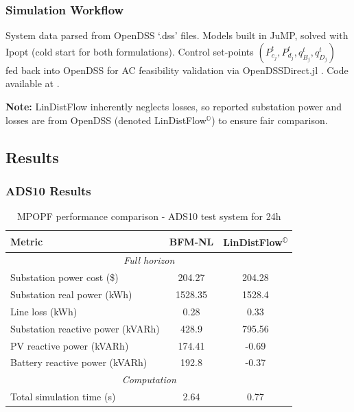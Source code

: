 \subsubsection{Simulation Workflow}

System data parsed from OpenDSS `.dss' files. Models built in JuMP, solved with Ipopt (cold start for both formulations). Control set-points $(P_{c_j}^t, P_{d_j}^t, q_{B_j}^t, q_{D_j}^t)$ fed back into OpenDSS for AC feasibility validation via OpenDSSDirect.jl \cite{OpenDSSDirect-jl}. Code available at \cite{MPOPFRepo}.

\textbf{Note:} LinDistFlow inherently neglects losses, so reported substation power and losses are from OpenDSS (denoted LinDistFlow$^{\mathbb{O}}$) to ensure fair comparison.

\subsection{Results}

\subsubsection{ADS10 Results}

\begin{table}[H]
    \centering
    \caption{MPOPF performance comparison - ADS10 test system for 24h}
    \label{table:mpopf-tradeoffs-opt-ads10}
    \begin{tabular}{|l|c|c|}
    \hline
    \textbf{Metric} & \textbf{BFM-NL} & \textbf{LinDistFlow\textsuperscript{\(\mathbb{O}\)}} \\ \hline
    \multicolumn{3}{|c|}{\textit{Full horizon}} \\ \hline
    Substation power cost (\$) & 204.27 & 204.28 \\ \hline
    Substation real power (kWh) & 1528.35 & 1528.4 \\ \hline
    Line loss (kWh) & 0.28 & 0.33 \\ \hline
    Substation reactive power (kVARh) & 428.9 & 795.56 \\ \hline
    PV reactive power (kVARh) & 174.41 & -0.69 \\ \hline
    Battery reactive power (kVARh) & 192.8 & -0.37 \\ \hline
    \multicolumn{3}{|c|}{\textit{Computation}} \\ \hline
    Total simulation time (s) & 2.64 & 0.77 \\ \hline
    \end{tabular}
\end{table}

